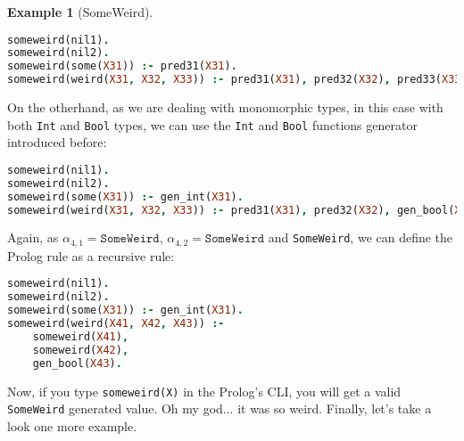 \documentclass{report}
\theoremstyle{definition}
\newtheorem{example}{Example}[section]
\theoremstyle{definition}
\newcommand{\ttt}[1]{\texttt{#1}}
\begin{document}
\begin{example}[SomeWeird]
\begin{lstlisting}[language=Prolog]
someweird(nil1).																														%% rule 1
someweird(nil2).																														%% rule 2
someweird(some(X31)) :- pred31(X31).																				%% rule 3
someweird(weird(X31, X32, X33)) :- pred31(X31), pred32(X32), pred33(X33).		%% rule 4
\end{lstlisting}
On the otherhand, as we are dealing with monomorphic types, in this case with both \ttt{Int} and \ttt{Bool} types, we can use the \ttt{Int} and \ttt{Bool} functions generator introduced before:\\
\begin{lstlisting}[language=Prolog]
someweird(nil1).																														%% rule 1
someweird(nil2).																														%% rule 2
someweird(some(X31)) :- gen_int(X31).																				%% rule 3
someweird(weird(X31, X32, X33)) :- pred31(X31), pred32(X32), gen_bool(X33).	%% rule 4
\end{lstlisting}
Again, as $\alpha_{4,1} = \ttt{SomeWeird}$, $\alpha_{4,2} = \ttt{SomeWeird}$ and \ttt{SomeWeird}, we can define the Prolog rule as a recursive rule:\\
\begin{lstlisting}[language=Prolog]
someweird(nil1).																														%% rule 1
someweird(nil2).																														%% rule 2
someweird(some(X31)) :- gen_int(X31).																				%% rule 3
someweird(weird(X41, X42, X43)) :-																					%% rule 4
	someweird(X41),
	someweird(X42),
	gen_bool(X43).
\end{lstlisting}
Now, if you type \ttt{someweird(X)} in the Prolog's CLI, you will get a valid \ttt{SomeWeird} generated value. Oh my god... it was so weird. Finally, let's take a look one more example.
\end{example}
\end{document}
